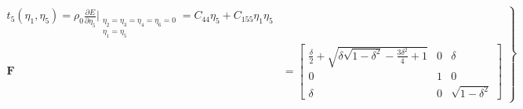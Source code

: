 \documentclass[showpacs,aps,floatfix,prb,reprint,superscriptaddress,onecolumn]{revtex4-1}
\begin{document}
\begin{enumerate}

\begin{equation}
\label{eqn:SM-s12}
  \left.\begin{aligned}
        t_{5} \left(\eta_{1}, \eta_{5}\right) = \rho_{0} \frac{\partial E}{\partial \eta_{5}}\Bigr|_{\substack{\eta_2=\eta_3=\eta_4=\eta_6=0 \\ \eta_{1}=\eta_{5}}} = C_{44}\eta_{5} + C_{155}\eta_{1}\eta_{5}\\
        \bm{F}&=\begin{bmatrix} \frac{\delta}{2}+\sqrt{\delta \sqrt{1-\delta^2}-\frac{3 \delta^2}{4}+1} & 0 & \delta \\ 0 & 1 & 0 \\ \delta & 0 & \sqrt{1-\delta^2} 
				\end{bmatrix}
       \end{aligned}
			\right\}
\end{equation}















\end{enumerate}
\end{document}

